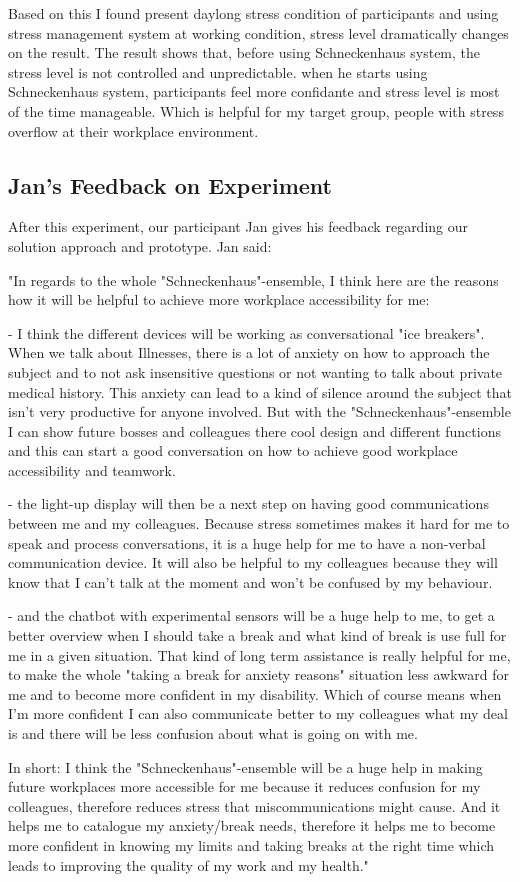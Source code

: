 Based on this I found present daylong stress condition of participants and using stress management system at working condition, stress level dramatically changes on the result. The result shows that, before using Schneckenhaus system, the stress level is not controlled and unpredictable. when he starts using Schneckenhaus system, participants feel more confidante and stress level is most of the time manageable. Which is helpful for my target group, people with stress overflow at their workplace environment. 

\subsection{Jan's Feedback on Experiment}
After this experiment, our participant Jan gives his feedback regarding our solution approach and prototype. Jan said:

"In regards to the whole "Schneckenhaus"-ensemble, I think here are the reasons how it will be helpful to achieve more workplace accessibility for me:

- I think the different devices will be working as conversational "ice breakers". When we talk about Illnesses, there is a lot of anxiety on how to approach the subject and to not ask insensitive questions or not wanting to talk about private medical history. This anxiety can lead to a kind of silence around the subject that isn't very productive for anyone involved. But with the "Schneckenhaus"-ensemble I can show future bosses and colleagues there cool design and different functions and this can start a good conversation on how to achieve good workplace accessibility and teamwork.

- the light-up display will then be a next step on having good communications between me and my colleagues. Because stress sometimes makes it hard for me to speak and process conversations, it is a huge help for me to have a non-verbal communication device. It will also be helpful to my colleagues because they will know that I can't talk at the moment and won't be confused by my behaviour.

- and the chatbot with experimental sensors will be a huge help to me, to get a better overview when I should take a break and what kind of break is use full for me in a given situation. That kind of long term assistance is really helpful for me, to make the whole "taking a break for anxiety reasons" situation less awkward for me and to become more confident in my disability. Which of course means when I'm more confident I can also communicate better to my colleagues what my deal is and there will be less confusion about what is going on with me.

In short: I think the "Schneckenhaus"-ensemble will be a huge help in making future workplaces more accessible for me because it reduces confusion for my colleagues, therefore reduces stress that miscommunications might cause. And it helps me to catalogue my anxiety/break needs, therefore it helps me to become more confident in knowing my limits and taking breaks at the right time which leads to improving the quality of my work and my health."



